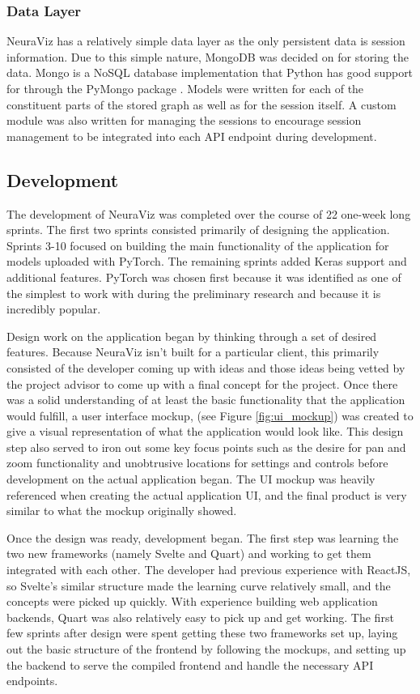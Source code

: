 \subsubsection{Data Layer}
NeuraViz has a relatively simple data layer as the only persistent data is session information. Due to this simple nature, MongoDB \cite{mongodb} was decided on for storing the data. Mongo is a NoSQL database implementation that Python has good support for through the PyMongo package \cite{pymongo}. Models were written for each of the constituent parts of the stored graph as well as for the session itself. A custom module was also written for managing the sessions to encourage session management to be integrated into each API endpoint during development.

\subsection{Development}
The development of NeuraViz was completed over the course of 22 one-week long sprints. The first two sprints consisted primarily of designing the application. Sprints 3-10 focused on building the main functionality of the application for models uploaded with PyTorch. The remaining sprints added Keras support and additional features. PyTorch was chosen first because it was identified as one of the simplest to work with during the preliminary research and because it is incredibly popular. 

Design work on the application began by thinking through a set of desired features. Because NeuraViz isn't built for a particular client, this primarily consisted of the developer coming up with ideas and those ideas being vetted by the project advisor to come up with a final concept for the project. Once there was a solid understanding of at least the basic functionality that the application would fulfill, a user interface mockup, (see Figure \ref{fig:ui_mockup}) was created to give a visual representation of what the application would look like. This design step also served to iron out some key focus points such as the desire for pan and zoom functionality and unobtrusive locations for settings and controls before development on the actual application began. The UI mockup was heavily referenced when creating the actual application UI, and the final product is very similar to what the mockup originally showed.

Once the design was ready, development began. The first step was learning the two new frameworks (namely Svelte and Quart) and working to get them integrated with each other. The developer had previous experience with ReactJS, so Svelte's similar structure made the learning curve relatively small, and the concepts were picked up quickly. With experience building web application backends, Quart was also relatively easy to pick up and get working. The first few sprints after design were spent getting these two frameworks set up, laying out the basic structure of the frontend by following the mockups, and setting up the backend to serve the compiled frontend and handle the necessary API endpoints.

